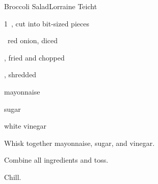 \begin{recipe}{Broccoli Salad}{Lorraine Teicht}{}

\begin{ingredients}
\item 1~, cut into bit-sized pieces
\item \half~red onion, diced
\item \lbs{\half} , fried and chopped
\item \C{\half} , shredded
\item \C{\half} mayonnaise
\item \C{\half} sugar
\item {} white vinegar
\end{ingredients}

\begin{directions}
\item Whisk together mayonnaise, sugar, and vinegar.
\item Combine all ingredients and toss.
\item Chill.
\end{directions}

\end{recipe}
